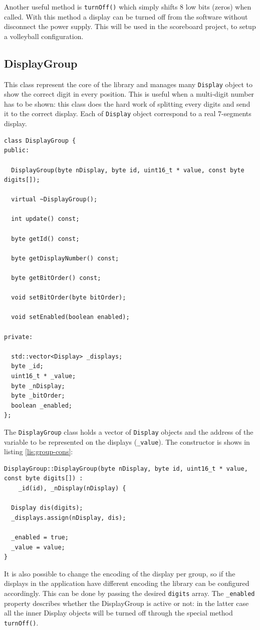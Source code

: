 \documentclass[11pt,english]{article}
\newcommand{\code}[1]{\texttt{#1}}
\begin{document}
Another useful method is \code{turnOff()} which simply shifts 8 low bits (zeros) when called. With this 
method a display can be turned off from the software without disconnect the power supply.
This will be used in the scoreboard project, to setup a volleyball configuration.


\subsection{DisplayGroup}

This class represent the core of the library and manages many \code{Display} object to show the 
correct digit in every position. This is useful when a multi-digit number has to be shown: this class 
does the hard work of splitting every digits and send it to the correct display. Each of \code{Display} 
object correspond to a real 7-segments display.
%
\begin{lstlisting}[label=lis:dis-group-class,caption=DisplayGroup class]
class DisplayGroup {
public:

  DisplayGroup(byte nDisplay, byte id, uint16_t * value, const byte digits[]);

  virtual ~DisplayGroup();

  int update() const;

  byte getId() const;

  byte getDisplayNumber() const;

  byte getBitOrder() const;

  void setBitOrder(byte bitOrder);

  void setEnabled(boolean enabled);

private:

  std::vector<Display> _displays; 
  byte _id;                       
  uint16_t * _value;              
  byte _nDisplay;                 
  byte _bitOrder;                 
  boolean _enabled;               
};
\end{lstlisting}

The \code{DisplayGroup} class holds a vector of \code{Display} objects and the address of the 
variable to be represented on the displays (\code{\_value}). 
The constructor is shows in listing \ref{lis:group-cons}:
%
\begin{lstlisting}[label=lis:group-cons,caption=DisplayGroup class constructor]
DisplayGroup::DisplayGroup(byte nDisplay, byte id, uint16_t * value, const byte digits[]) :
    _id(id), _nDisplay(nDisplay) {

  Display dis(digits);
  _displays.assign(nDisplay, dis);

  _enabled = true;
  _value = value;
}
\end{lstlisting}
%
It is also possible to change the encoding of the display per group, so if the displays in 
the application have different encoding the library can be configured accordingly.
This can be done by passing the desired \code{digits} array.
The \code{\_enabled} property describes whether the DisplayGroup is active or not: in the latter 
case all the inner Display objects will be turned off through the special method \code{turnOff()}.
\end{document}

